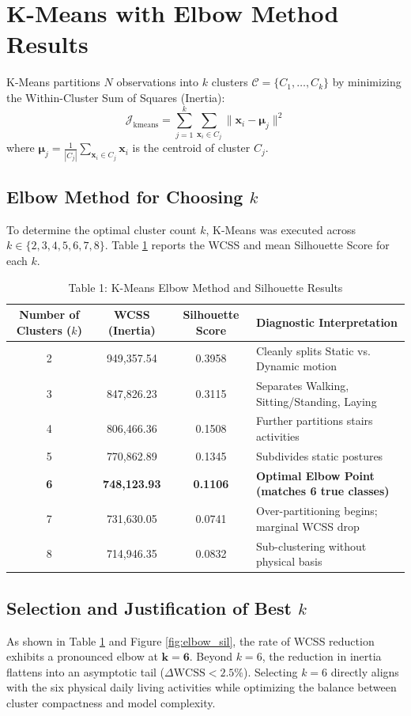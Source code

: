 \documentclass[12pt,a4paper]{article}
\begin{document}
\section{K-Means with Elbow Method Results}
K-Means partitions $N$ observations into $k$ clusters $\mathcal{C} = \{C_1, \dots, C_k\}$ by minimizing the Within-Cluster Sum of Squares (Inertia):
\begin{equation}
\mathcal{J}_{\text{kmeans}} = \sum_{j=1}^k \sum_{\mathbf{x}_i \in C_j} \|\mathbf{x}_i - \boldsymbol{\mu}_j\|^2
\end{equation}
where $\boldsymbol{\mu}_j = \frac{1}{|C_j|} \sum_{\mathbf{x}_i \in C_j} \mathbf{x}_i$ is the centroid of cluster $C_j$.

\subsection{Elbow Method for Choosing $k$}
To determine the optimal cluster count $k$, K-Means was executed across $k \in \{2, 3, 4, 5, 6, 7, 8\}$. Table \ref{tab:kmeans} reports the WCSS and mean Silhouette Score for each $k$.

\begin{table}[H]
\centering
\caption{Table 1: K-Means Elbow Method and Silhouette Results}
\label{tab:kmeans}
\begin{tabular}{|c|c|c|p{6cm}|}
\hline
\textbf{Number of Clusters ($k$)} & \textbf{WCSS (Inertia)} & \textbf{Silhouette Score} & \textbf{Diagnostic Interpretation} \\ \hline
2 & 949,357.54 & 0.3958 & Cleanly splits Static vs. Dynamic motion \\ \hline
3 & 847,826.23 & 0.3115 & Separates Walking, Sitting/Standing, Laying \\ \hline
4 & 806,466.36 & 0.1508 & Further partitions stairs activities \\ \hline
5 & 770,862.89 & 0.1345 & Subdivides static postures \\ \hline
\textbf{6} & \textbf{748,123.93} & \textbf{0.1106} & \textbf{Optimal Elbow Point (matches 6 true classes)} \\ \hline
7 & 731,630.05 & 0.0741 & Over-partitioning begins; marginal WCSS drop \\ \hline
8 & 714,946.35 & 0.0832 & Sub-clustering without physical basis \\ \hline
\end{tabular}
\end{table}

\subsection{Selection and Justification of Best $k$}
As shown in Table \ref{tab:kmeans} and Figure \ref{fig:elbow_sil}, the rate of WCSS reduction exhibits a pronounced elbow at $\mathbf{k=6}$. Beyond $k=6$, the reduction in inertia flattens into an asymptotic tail ($\Delta \text{WCSS} < 2.5\%$). Selecting $k=6$ directly aligns with the six physical daily living activities while optimizing the balance between cluster compactness and model complexity.
\end{document}
